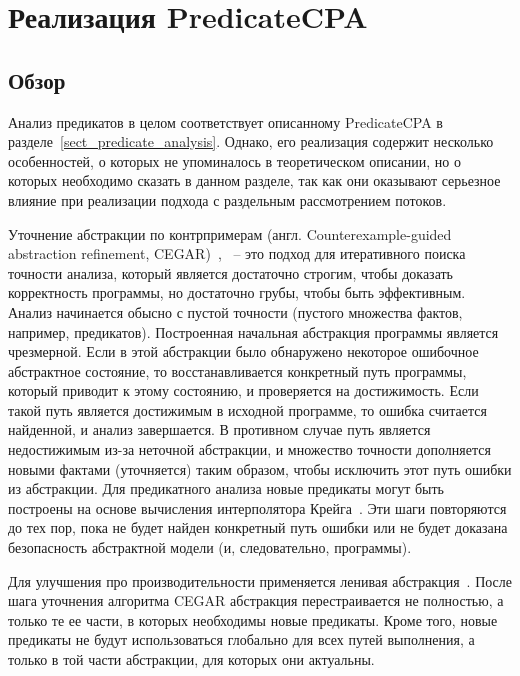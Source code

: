 \section{Реализация PredicateCPA}
\label{sect_impl_predicate}

\subsection{Обзор}
Анализ предикатов в целом соответствует описанному PredicateCPA в разделе~\ref{sect_predicate_analysis}.
Однако, его реализация содержит несколько особенностей, о которых не упоминалось в теоретическом описании, но о которых необходимо сказать в данном разделе, так как они оказывают серьезное влияние при реализации подхода с раздельным рассмотрением потоков.

Уточнение абстракции по контрпримерам (англ. Counterexample-guided abstraction refinement, CEGAR)~\cite{clarke:cegar},~\cite{CEGAR01} -- это подход для итеративного поиска точности анализа, который является достаточно строгим, чтобы доказать корректность программы, но достаточно грубы, чтобы быть эффективным. 
Анализ начинается обысно с пустой точности (пустого множества фактов, например, предикатов).
Построенная начальная абстракция программы является чрезмерной.
Если в этой абстракции было обнаружено некоторое ошибочное абстрактное состояние, то восстанавливается конкретный путь программы, который приводит к этому состоянию, и проверяется на достижимость.
Если такой путь является достижимым в исходной программе, то ошибка считается найденной, и анализ завершается.
В противном случае путь является недостижимым из-за неточной абстракции, и множество точности дополняется новыми фактами (уточняется) таким образом, чтобы исключить этот путь ошибки из абстракции.
Для предикатного анализа новые предикаты могут быть построены на основе вычисления интерполятора Крейга~\cite{CraigInterpol}. Эти шаги повторяются до тех пор, пока не будет найден конкретный путь ошибки или не будет доказана безопасность абстрактной модели (и, следовательно, программы).

Для улучшения про производительности применяется ленивая абстракция~\cite{LazyAbstraction}.
После шага уточнения алгоритма CEGAR абстракция перестраивается не полностью, а только те ее части, в которых необходимы новые предикаты.
Кроме того, новые предикаты не будут использоваться глобально для всех путей выполнения, а только в той части абстракции, для которых они актуальны.

